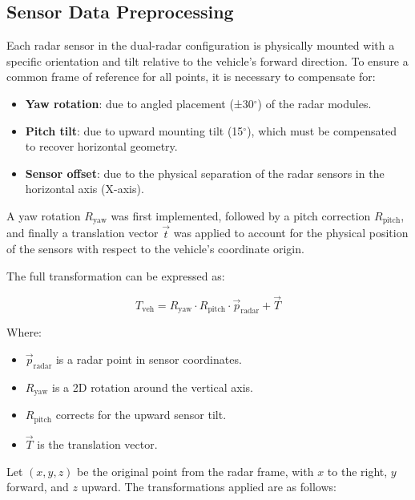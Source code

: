 \subsection{Sensor Data Preprocessing}
\label{subsec:transformations}

Each radar sensor in the dual-radar configuration is physically mounted with a specific orientation and tilt relative to the vehicle's forward direction. 
To ensure a common frame of reference for all points, it is necessary to compensate for:

\begin{itemize}
    \item \textbf{Yaw rotation}: due to angled placement (±30$^\circ$) of the radar modules.
    \item \textbf{Pitch tilt}: due to upward mounting tilt (15$^\circ$), which must be compensated to recover horizontal geometry.
    \item \textbf{Sensor offset}: due to the physical separation of the radar sensors in the horizontal axis (X-axis).
\end{itemize}

A yaw rotation \( R_{\text{yaw}} \) was first implemented, followed by a pitch correction \( R_{\text{pitch}} \), and finally a translation vector \( \vec{t} \) was applied to account for the physical position of the sensors with respect to the vehicle's coordinate origin.

The full transformation can be expressed as:

\begin{equation}
T_{\text{veh}} = R_{\text{yaw}} \cdot R_{\text{pitch}} \cdot \vec{p}_{\text{radar}} + \vec{T}
\label{eq:radar_to_vehicle_transform}
\end{equation}

Where:
\begin{itemize}
    \item \( \vec{p}_{\text{radar}} \) is a radar point in sensor coordinates.
    \item \( R_{\text{yaw}} \) is a 2D rotation around the vertical axis.
    \item \( R_{\text{pitch}} \) corrects for the upward sensor tilt.
    \item \( \vec{T} \) is the translation vector.
\end{itemize}

\vspace{1em}

Let $(x, y, z)$ be the original point from the radar frame, with $x$ to the right, $y$ forward, and $z$ upward. 
The transformations applied are as follows:

